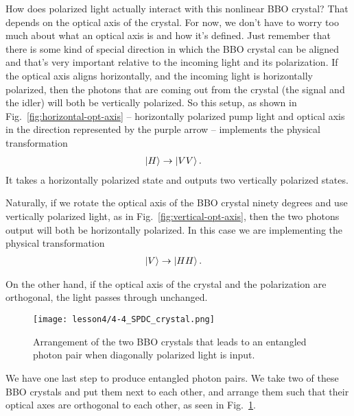 How does polarized light actually interact with this nonlinear BBO crystal? That depends on the optical axis of the crystal. For now, we don't have to worry too much about what an optical axis is and how it's defined. Just remember that there is some kind of special direction in which the BBO crystal can be aligned and that's very important relative to the incoming light and its polarization. If the optical axis aligns horizontally, and the incoming light is horizontally polarized, then the photons that are coming out from the crystal (the signal and the idler) will both be vertically polarized. So this setup, as shown in Fig.~\ref{fig:horizontal-opt-axis} -- horizontally polarized pump light and optical axis in the direction represented by the purple arrow -- implements the physical transformation
\begin{equation}
\begin{aligned}
\left| H \right\rangle &\rightarrow \left| VV \right\rangle.
\end{aligned}
\end{equation}
It takes a horizontally polarized state and outputs two vertically polarized states.

Naturally, if we rotate the optical axis of the BBO crystal ninety degrees and use vertically polarized light, as in Fig.~\ref{fig:vertical-opt-axis}, then the two photons output will both be horizontally polarized.  In this case we are implementing the physical transformation
\begin{equation}
\begin{aligned}
\left| V \right\rangle &\rightarrow \left| HH \right\rangle.
\end{aligned}
\end{equation}

On the other hand, if the optical axis of the crystal and the polarization are orthogonal, the light passes through unchanged.

\begin{figure}[t]
    \centering
    \texttt{[image: lesson4/4-4\_SPDC\_crystal.png]}
    \caption[BBO crystal arrangement]{Arrangement of the two BBO crystals that leads to an entangled photon pair when diagonally polarized light is input.}
    \label{fig:4-4_SPDC_crystals}
\end{figure}

We have one last step to produce entangled photon pairs.  We take two of these BBO crystals and put them next to each other, and arrange them such that their optical axes are orthogonal to each other, as seen in Fig.~\ref{fig:4-4_SPDC_crystals}.

